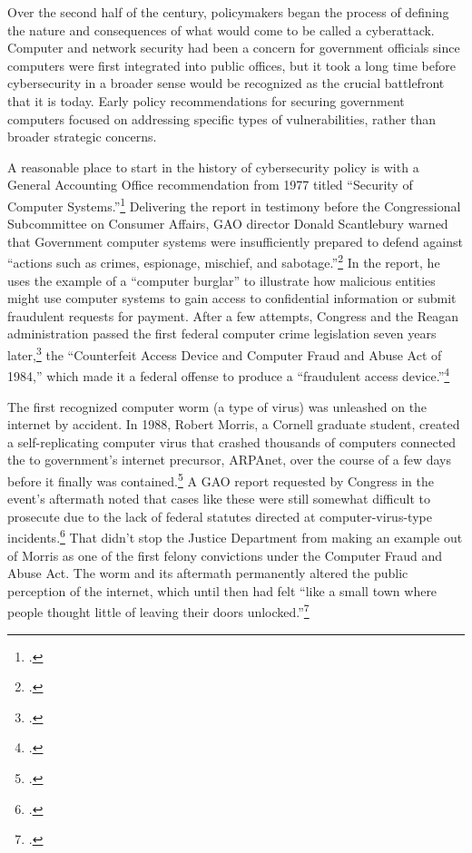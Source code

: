 \documentclass{memoir}
\begin{document}
\begin{refsegment}
Over the second half of the  century, policymakers began the process of defining the nature and consequences of what would come to be called a cyberattack. Computer and network security had been a concern for government officials since computers were first integrated into public offices, but it took a long time before cybersecurity in a broader sense would be recognized as the crucial battlefront that it is today. Early policy recommendations for securing government computers focused on addressing specific types of vulnerabilities, rather than broader strategic concerns.

A reasonable place to start in the history of cybersecurity policy is with a General Accounting Office recommendation from 1977 titled ``Security of Computer Systems.''\footcite{washington_post_staff_timeline_2003} Delivering the report in testimony before the Congressional Subcommittee on Consumer Affairs, GAO director Donald Scantlebury warned that Government computer systems were insufficiently prepared to defend against ``actions such as crimes, espionage, mischief, and sabotage.''\footcite{u.s._government_accounting_office_security_1977} In the report, he uses the example of a ``computer burglar'' to illustrate how malicious entities might use computer systems to gain access to confidential information or submit fraudulent requests for payment. After a few attempts, Congress and the Reagan administration passed the first federal computer crime legislation seven years later,\footcite[This later bill, the Computer Security Act of 1987, describes the 1984 bill as being the first federal legislation in this area.]{glickman_computer_1988} the ``Counterfeit Access Device and Computer Fraud and Abuse Act of 1984,'' which made it a federal offense to produce a ``fraudulent access device.''\footcite{hughes_access_1984}

The first recognized computer worm (a type of virus) was unleashed on the internet by accident. In 1988, Robert Morris, a Cornell graduate student, created a self-replicating computer virus that crashed thousands of computers connected the to government's internet precursor, ARPAnet, over the course of a few days before it finally was contained.\footcite[This source, a master's thesis for the USAF Air University, makes the dramatic and completely unsubstantiated claim that the Morris worm infected half of of ARPAnet's 88,000 computers. The more popular (and plausible) claim is that of the roughly 60,000 ARPAnet-connected computers, the worm infected 10\% of them, though that number is not particularly well substantiated either.]{moore_conception_2014} A GAO report requested by Congress in the event's aftermath noted that cases like these were still somewhat difficult to prosecute due to the lack of federal statutes directed at computer-virus-type incidents.\footcite{u._s._government_accounting_office_computer_1989} That didn't stop the Justice Department from making an example out of Morris as one of the first felony convictions under the Computer Fraud and Abuse Act. The worm and its aftermath permanently altered the public perception of the internet, which until then had felt ``like a small town where people thought little of leaving their doors unlocked.''\footcite{lee_how_2013}


\end{refsegment}
\end{document}

